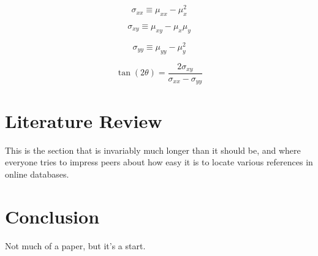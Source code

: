 \documentclass{article}
\newcommand{\meanx}{\ensuremath{\mu_{x}}}
\newcommand{\meanxsquared}{\ensuremath{\mu_{x}^{2}}}
\newcommand{\meany}{\ensuremath{\mu_{y}}}
\newcommand{\meanysquared}{\ensuremath{\mu_{y}^{2}}}
\newcommand{\meanxx}{\ensuremath{\mu_{xx}}}
\newcommand{\meanxy}{\ensuremath{\mu_{xy}}}
\newcommand{\meanyy}{\ensuremath{\mu_{yy}}}
\newcommand{\sxx}{\ensuremath{\sigma_{xx}}}
\newcommand{\sxy}{\ensuremath{\sigma_{xy}}}
\newcommand{\syy}{\ensuremath{\sigma_{yy}}}
\begin{document}
\begin{equation}
\sxx \equiv \meanxx - {\meanxsquared}
\end{equation}

\begin{equation}
\sxy \equiv \meanxy - \meanx \meany
\end{equation}

\begin{equation}
\syy \equiv \meanyy - \meanysquared
\end{equation}

\begin{equation}
\tan \left( 2 \theta \right) = \frac{2 \sxy}{\sxx - \syy}
\end{equation}

\section{Literature Review}
This is the section that is invariably much longer than it should be, and
where everyone tries to impress peers about how easy it is to locate various
references in online databases.

\section{Conclusion}
Not much of a paper, but it's a start.
\end{document}
